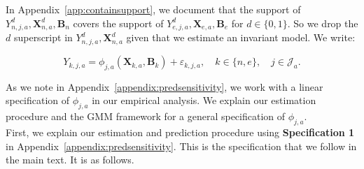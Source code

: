 \noindent In Appendix~\ref{app:containsupport}, we document that the support of $Y_{n,j,a}^d, \bm{X}_{n,a}^d, \bm{B}_{n}$ covers the support of $Y_{e,j,a}^d, \bm{X}_{e,a}, \bm{B}_{e}$ for $d \in \{0, 1\}$. So we drop the $d$ superscript in $Y_{n,j,a}^d, \bm{X}_{n,a}^d$ given that we estimate an invariant model. We write:

\begin{equation}\label{eq:routcome}
Y_{k,j,a} = \phi_{j,a} (\bm{X}_{k,a}, \bm{B}_k) + \varepsilon_{k,j,a}, \quad k \in \{n,e\}, \quad j \in \mathcal{J}_a.
\end{equation}

\noindent As we note in Appendix~\ref{appendix:predsensitivity}, we work with a linear specification of $\phi_{j,a}$ in our empirical analysis. We explain our estimation procedure and the GMM framework for a general specification of $\phi_{j,a}$.\\

\noindent First, we explain our estimation and prediction procedure using \textbf{Specification 1} in Appendix~\ref{appendix:predsensitivity}. This is the specification that we follow in the main text. It is as follows.

